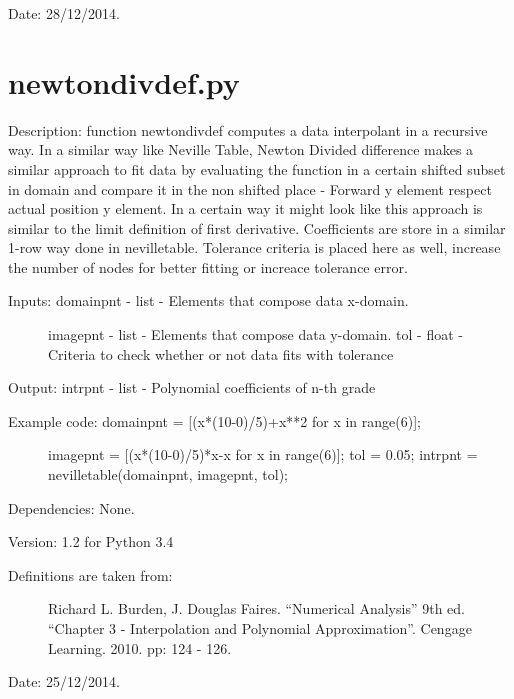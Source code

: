 \documentclass[letterpaper,10pt,oneside]{sphinxmanual}
\theoremstyle{plain}%
\theoremstyle{definition}%
\theoremstyle{remark}%
\begin{document}
Date: 28/12/2014.


\section{newtondivdef.py}
\label{code:newtondivdef-py}\label{code:module-newtondivdef}
Description: function newtondivdef computes a data interpolant in a recursive
way. In a similar way like Neville Table, Newton Divided difference makes
a similar approach to fit data by evaluating the function in a certain
shifted subset in domain and compare it in the non shifted place - Forward
y element respect actual position y element. In a certain way it might look
like this approach is similar to the limit definition of first derivative.
Coefficients are store in a similar 1-row way done in nevilletable. Tolerance
criteria is placed here as well, increase the number of nodes for better 
fitting or increace tolerance error.
\begin{description}
\item[{Inputs: domainpnt - list - Elements that compose data x-domain. }] \leavevmode
imagepnt - list - Elements that compose data y-domain.
tol - float - Criteria to check whether or not data fits with tolerance

\end{description}

Output: intrpnt - list - Polynomial coefficients of n-th grade
\begin{description}
\item[{Example code: domainpnt = {[}(x*(10-0)/5)+x**2 for x in range(6){]};}] \leavevmode
imagepnt = {[}(x*(10-0)/5)*x-x for x in range(6){]};
tol = 0.05;
intrpnt = nevilletable(domainpnt, imagepnt, tol);

\end{description}

Dependencies: None.

Version: 1.2 for Python 3.4
\begin{description}
\item[{Definitions are taken from:}] \leavevmode
Richard L. Burden, J. Douglas Faires. ``Numerical Analysis'' 9th ed.
``Chapter 3 - Interpolation and Polynomial Approximation''. 
Cengage Learning. 2010. pp: 124 - 126.

\end{description}




Date: 25/12/2014.
\end{document}
